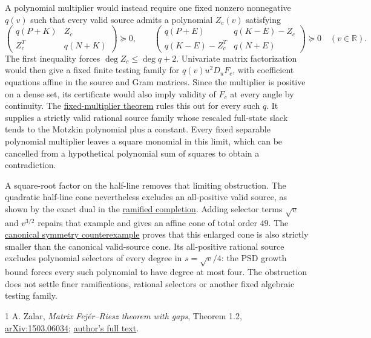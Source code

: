 \documentclass[11pt]{article}
\newcommand{\PSD}{\succeq0}
\newcommand{\R}{\mathbb R}
\begin{document}
A polynomial multiplier would instead require one fixed nonzero
nonnegative $q(v)$ such that every valid source admits a polynomial
$Z_c(v)$ satisfying
\[
\begin{pmatrix}q(P+K)&Z_c\\Z_c^T&q(N+K)\end{pmatrix}\PSD,\qquad
\begin{pmatrix}q(P+E)&q(K-E)-Z_c\\q(K-E)-Z_c^T&q(N+E)\end{pmatrix}\PSD
\quad(v\in\R).
\]
The first inequality forces $\deg Z_c\leq\deg q+2$. Univariate matrix
factorization would then give a fixed finite testing family for
$q(v)u^2D_uF_c$, with coefficient equations affine in the source and Gram
matrices. Since the multiplier is positive on a dense set, its certificate
would also imply validity of $F_c$ at every angle by continuity.
The
\href{https://github.com/anubhav70747/q222-finite-sdp/tree/main/extracted-lifts/canonical-completion/polynomial-obstruction}{fixed-multiplier theorem}
rules this out for every such $q$. It supplies a strictly valid rational
source family whose rescaled full-state slack tends to the Motzkin
polynomial plus a constant. Every fixed separable polynomial multiplier
leaves a square monomial in this limit, which can be cancelled from a
hypothetical polynomial sum of squares to obtain a contradiction.

A square-root factor on the half-line removes that limiting obstruction.
The quadratic half-line cone nevertheless excludes an all-positive valid
source, as shown by the exact dual in the
\href{https://github.com/anubhav70747/q222-finite-sdp/tree/main/extracted-lifts/canonical-completion/ramified-completion}{ramified completion}.
Adding selector terms $\sqrt v$ and $v^{3/2}$ repairs that example and gives
an affine cone of total order $49$. The
\href{ramified-obstruction/Q222_Ramified_Quartic_Obstruction.pdf}{canonical symmetry counterexample}
proves that this enlarged cone is also strictly smaller than the canonical
valid-source cone. Its all-positive rational source excludes polynomial
selectors of every degree in $s=\sqrt v/4$: the PSD growth bound forces
every such polynomial to have degree at most four. The obstruction does
not settle finer ramifications, rational selectors or another fixed
algebraic testing family.

\begin{thebibliography}{1}
 A. Zalar, \emph{Matrix Fej\'er--Riesz theorem with gaps},
Theorem 1.2, \href{https://arxiv.org/abs/1503.06034}{arXiv:1503.06034};
\href{https://zalara.github.io/Papers/MatrixFejerRieszArxivOriginal.pdf}{author's full text}.
\end{thebibliography}
\end{document}
